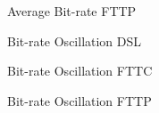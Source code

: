 \documentclass[10pt,sigconf]{acmart}
\begin{document}
\begin{figure}
    \centering
    \caption{Average Bit-rate FTTP}
    \label{fig:avg-bitrate-FTTP}
\end{figure}

\begin{figure}
    \centering
    \caption{ Bit-rate Oscillation DSL}
    \label{fig:avg-oscillation-DSL}
\end{figure}

\begin{figure}
    \centering
    \caption{ Bit-rate Oscillation FTTC}
    \label{fig:avg-oscillation-FTTC}
\end{figure}

\begin{figure}
    \centering
    \caption{ Bit-rate Oscillation FTTP}
    \label{fig:avg-oscillation-FTTP}
\end{figure}



\end{document}
